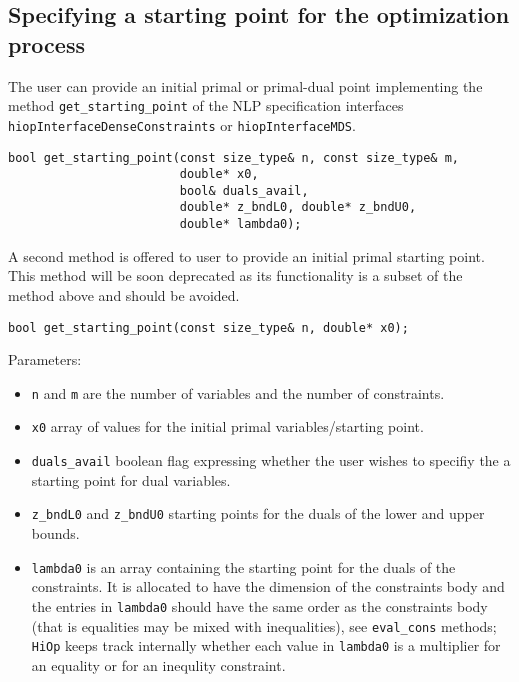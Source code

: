 \documentclass[11pt]{article}
\newcommand{\Hi}{\texttt{HiOp}\xspace}
\begin{document}
%
%

\subsection{Specifying a starting point for the optimization process}

The user  can  provide an initial primal or primal-dual point implementing the method \texttt{get\_starting\_point} of the NLP specification interfaces \texttt{hiopInterfaceDenseConstraints} or \texttt{hiopInterfaceMDS}. 

\begin{lstlisting} 
bool get_starting_point(const size_type& n, const size_type& m,
                        double* x0,
                        bool& duals_avail,
                        double* z_bndL0, double* z_bndU0,
                        double* lambda0);
\end{lstlisting} 

A second method is offered to user to provide an initial primal starting point. This method will be soon deprecated as its functionality is a subset of the method above and should be avoided.

\begin{lstlisting} 
bool get_starting_point(const size_type& n, double* x0);
\end{lstlisting} 

Parameters:
\begin{itemize}
\item \texttt{n} and \texttt{m} are the number of variables and the number of constraints.
\item \texttt{x0} array of values for the initial primal variables/starting point.
\item \texttt{duals\_avail} boolean flag expressing whether the user wishes to specifiy the a starting point for dual variables.
\item \texttt{z\_bndL0} and  \texttt{z\_bndU0} starting points for the duals of the lower and upper bounds.
\item \texttt{lambda0} is an array containing the starting point for the duals of the constraints. It is allocated to have the dimension of the constraints body and the entries in \texttt{lambda0} should have the same order as the constraints body (that is equalities may be mixed with inequalities), see \texttt{eval\_cons} methods; \Hi keeps track internally whether each value in \texttt{lambda0} is a multiplier for an equality or for an inequlity constraint.
\end{itemize}
  
\end{document}
